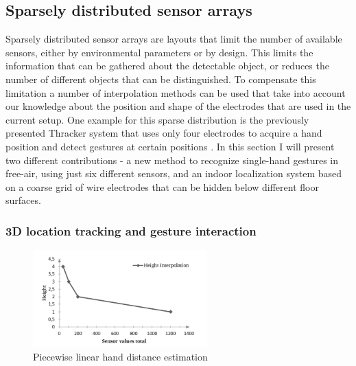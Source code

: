 \subsection{Sparsely distributed sensor arrays}
\label{ch:proc_sparse}
Sparsely distributed sensor arrays are layouts that limit the number of available sensors, either by environmental parameters or by design. This limits the information that can be gathered about the detectable object, or reduces the number of different objects that can be distinguished. To compensate this limitation a number of interpolation methods can be used that take into account our knowledge about the position and shape of the electrodes that are used in the current setup. One example for this sparse distribution is the previously presented Thracker system that uses only four electrodes to acquire a hand position and detect gestures at certain positions \cite{Wimmer2007a}. In this section I will present two different contributions - a new method to recognize single-hand gestures in free-air, using just six different sensors, and an indoor localization system based on a coarse grid of wire electrodes that can be hidden below different floor surfaces.

\subsubsection{3D location tracking and gesture interaction}
\begin{figure}[h]
\centering
\includegraphics[width=0.6\textwidth]{images/magicbox_data_zaxis}
\caption{Piecewise linear hand distance estimation \cite{Braun2011MultiInputDevice}}
\label{fig:magicbox_data_zaxis}
\end{figure}

